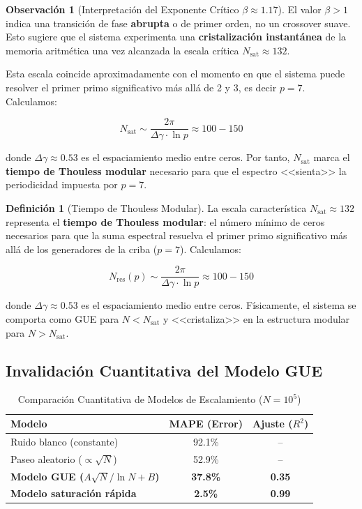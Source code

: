 \documentclass[12pt, a4paper]{article}
\theoremstyle{plain}
\theoremstyle{definition}
\newtheorem{definicion}[teorema]{Definición}
\newtheorem{observacion}[teorema]{Observación}
\theoremstyle{remark}
\begin{document}
\begin{observacion}[Interpretación del Exponente Crítico $\beta \approx 1.17$]
El valor $\beta > 1$ indica una transición de fase \textbf{abrupta} o de primer 
orden, no un crossover suave. Esto sugiere que el sistema experimenta una 
\textbf{cristalización instantánea} de la memoria aritmética una vez alcanzada 
la escala crítica $N_{\text{sat}} \approx 132$.

Esta escala coincide aproximadamente con el momento en que el sistema puede 
resolver el primer primo significativo más allá de 2 y 3, es decir $p=7$. 
Calculamos:

\[
N_{\text{sat}} \sim \frac{2\pi}{\Delta \gamma \cdot \ln p} \approx 100-150
\]

donde $\Delta \gamma \approx 0.53$ es el espaciamiento medio entre ceros. 
Por tanto, $N_{\text{sat}}$ marca el \textbf{tiempo de Thouless modular} 
necesario para que el espectro <<sienta>> la periodicidad impuesta por $p=7$.
\end{observacion}


\begin{definicion}[Tiempo de Thouless Modular]
\label{def:tiempo_thouless}
La escala característica $N_{\text{sat}} \approx 132$ representa el 
\textbf{tiempo de Thouless modular}: el número mínimo de ceros necesarios 
para que la suma espectral resuelva el primer primo significativo más allá 
de los generadores de la criba ($p=7$). Calculamos:

\[
N_{\text{res}}(p) \sim \frac{2\pi}{\Delta \gamma \cdot \ln p} \approx 100-150
\]

donde $\Delta \gamma \approx 0.53$ es el espaciamiento medio entre ceros. 
Físicamente, el sistema se comporta como GUE para $N < N_{\text{sat}}$ 
y <<cristaliza>> en la estructura modular para $N > N_{\text{sat}}$.
\end{definicion}

\subsection{Invalidación Cuantitativa del Modelo GUE}
\label{subsec:invalidacion_gue}

\begin{table}[H]
\centering
\caption{Comparación Cuantitativa de Modelos de Escalamiento ($N=10^5$)}
\label{tab:modelos_snr}
\begin{tabular}{@{}lcc@{}}
\toprule
\textbf{Modelo} & \textbf{MAPE (Error)} & \textbf{Ajuste ($R^2$)} \\
\midrule
Ruido blanco (constante) & 92.1\% & -- \\
Paseo aleatorio ($\propto \sqrt{N}$) & 52.9\% & -- \\
\textbf{Modelo GUE ($A\sqrt{N}/\ln N + B$)} & \textbf{37.8\%} & \textbf{0.35} \\
\textbf{Modelo saturación rápida} & \textbf{2.5\%} & \textbf{0.99} \\
\bottomrule
\end{tabular}
\end{table}
\end{document}

